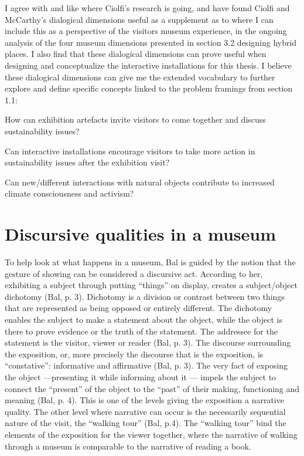 I agree with and like where Ciolfi’s research is going, and have found Ciolfi and McCarthy’s dialogical dimensions useful as a supplement as to where I can include this as a perspective of the visitors museum experience, in the ongoing analysis of the four museum dimensions presented in section 3.2 designing hybrid places. I also find that these dialogical dimensions can prove useful when designing and conceptualize the interactive installations for this thesis. I believe these dialogical dimensions can give me the extended vocabulary to further explore and define specific concepts linked to the problem framings from section 1.1:

How can exhibition artefacts invite visitors to come together and discuss sustainability issues?\par
Can interactive installations encourage visitors to take more action in sustainability issues after the exhibition visit?\par
Can new/different interactions with natural objects contribute to increased climate consciousness and activism?\par


\section{Discursive qualities in a museum}
\par

To help look at what happens in a museum, Bal is guided by the notion that the gesture of showing can be considered a discursive act. According to her, exhibiting a subject through putting “things” on display, creates a subject/object dichotomy (Bal, p. 3). Dichotomy is a division or contrast between two things that are represented as being opposed or entirely different. The dichotomy enables the subject to make a statement about the object, while the object is there to prove evidence or the truth of the statement. The addressee for the statement is the visitor, viewer or reader (Bal, p. 3). The discourse surrounding the exposition, or, more precisely the discourse that is the exposition, is “constative”: informative and affirmative (Bal, p. 3). The very fact of exposing the object —presenting it while informing about it — impels the subject to connect the “present” of the object to the “past” of their making, functioning and meaning (Bal, p. 4). This is one of the levels giving the exposition a narrative quality. The other level where narrative can occur is the necessarily sequential nature of the visit, the “walking tour” (Bal, p.4). The “walking tour” bind the elements of the exposition for the viewer together, where the narrative of walking through a museum is comparable to the narrative of reading a book.

